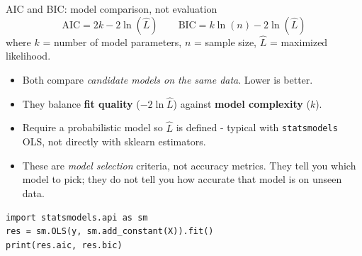 \documentclass[aspectratio=169]{beamer}
\begin{document}
\begin{frame}[fragile]{AIC and BIC: model comparison, not evaluation}
  \[
    \text{AIC} = 2k - 2 \ln(\hat{L})
    \qquad
    \text{BIC} = k \ln(n) - 2 \ln(\hat{L})
  \]
  where $k$ = number of model parameters, $n$ = sample size, $\hat{L}$ = maximized likelihood.
  \vfill
  \begin{itemize}
    \item Both compare \emph{candidate models on the same data}. Lower is better.
    \item They balance \textbf{fit quality} ($-2 \ln \hat{L}$) against \textbf{model complexity} ($k$).
    \item Require a probabilistic model so $\hat{L}$ is defined - typical with \texttt{statsmodels} OLS, not directly with sklearn estimators.
    \item These are \emph{model selection} criteria, not accuracy metrics. They tell you which model to pick; they do not tell you how accurate that model is on unseen data.
  \end{itemize}
  \vfill
{\lstset{basicstyle=\ttfamily\scriptsize}
\begin{lstlisting}
import statsmodels.api as sm
res = sm.OLS(y, sm.add_constant(X)).fit()
print(res.aic, res.bic)
\end{lstlisting}}
\end{frame}
\end{document}
